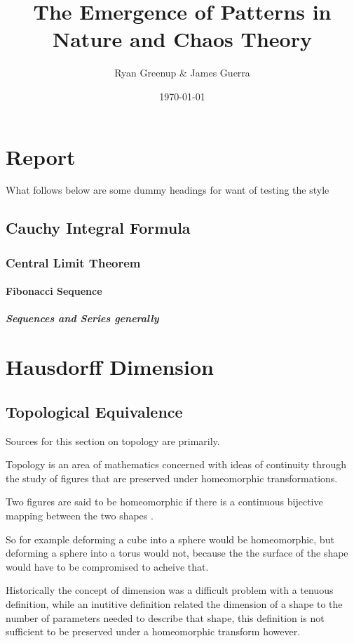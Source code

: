 \documentclass[11pt]{article}
\author{Ryan Greenup \& James Guerra}
\date{\today}
\title{The Emergence of Patterns in Nature and Chaos Theory}
\begin{document}
\maketitle
\tableofcontents

\section{Report}
\label{sec:org1e2e9f7}
What follows below are some dummy headings for want of testing the style
\subsection{Cauchy Integral Formula}
\label{sec:org9969620}
\subsubsection{Central Limit Theorem}
\label{sec:orgdcbbfb3}
\paragraph{Fibonacci Sequence}
\label{sec:orga2aa9a1}
\subparagraph{Sequences and Series generally}
\label{sec:org87f908d}
\section{Hausdorff Dimension}
\label{Hausdorff-dimension}
\subsection{Topological Equivalence}
\label{topological-equivalence}
Sources for this section on topology are primarily. \cite[p. 106]{peitgenChaosFractalsNew2004}

Topology is an area of mathematics concerned with ideas of continuity through the study of figures that are preserved under homeomorphic transformations. \cite{gilmoreTopologyChaosAlice2002}

Two figures are said to be homeomorphic if there is a continuous bijective mapping between the two shapes \cite[p. 105]{peitgenChaosFractalsNew2004}.

So for example deforming a cube into a sphere would be homeomorphic, but deforming a sphere into a torus would not, because the the surface of the shape would have to be compromised to acheive that.

Historically the concept of dimension was a difficult problem with a tenuous
definition, while an inutitive definition related the dimension of a shape to
the number of parameters needed to describe that shape, this definition is not
sufficient to be preserved under a homeomorphic transform however.
\end{document}
